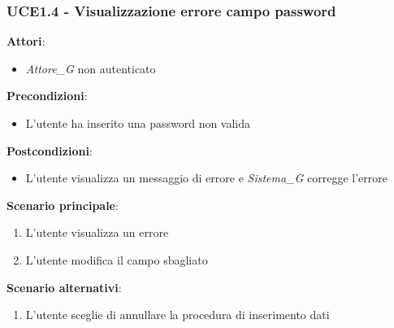 \subsubsection{UCE1.4 - Visualizzazione errore campo password}
\textbf{Attori}:
\begin{itemize}
    \item \textit{Attore_G} non autenticato
\end{itemize}
\textbf{Precondizioni}:
\begin{itemize}
    \item L'utente ha inserito una password non valida
\end{itemize}
\textbf{Postcondizioni}:
\begin{itemize}
    \item L'utente visualizza un messaggio di errore e \textit{Sistema_G} corregge l'errore
\end{itemize}
\textbf{Scenario principale}:
\begin{enumerate}
    \item L'utente visualizza un errore 
    \item L'utente modifica il campo sbagliato
\end{enumerate}
\textbf{Scenario alternativi}:
\begin{enumerate}
    \item L'utente sceglie di annullare la procedura di inserimento dati
\end{enumerate}